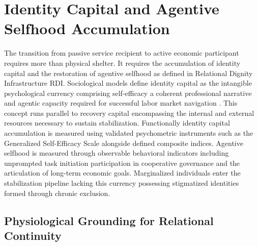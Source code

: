 \documentclass[12pt, letterpaper]{article}
\begin{document}
\section{Identity Capital and Agentive Selfhood Accumulation}

The transition from passive service recipient to active economic participant requires more than physical shelter. It requires the accumulation of identity capital and the restoration of agentive selfhood as defined in Relational Dignity Infrastructure RDI. Sociological models define identity capital as the intangible psychological currency comprising self-efficacy a coherent professional narrative and agentic capacity required for successful labor market navigation \citep{cote2002identity}. This concept runs parallel to recovery capital \citep{white2008recovery} encompassing the internal and external resources necessary to sustain stabilization. Functionally identity capital accumulation is measured using validated psychometric instruments such as the Generalized Self-Efficacy Scale \citep{schwarzer1995generalized} alongside defined composite indices. Agentive selfhood is measured through observable behavioral indicators including unprompted task initiation participation in cooperative governance and the articulation of long-term economic goals. Marginalized individuals enter the stabilization pipeline lacking this currency possessing stigmatized identities formed through chronic exclusion.

\subsection{Physiological Grounding for Relational Continuity}
\end{document}
